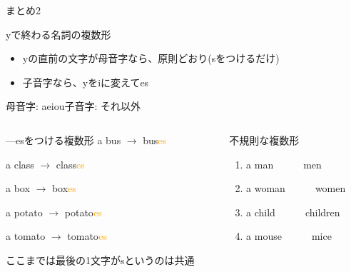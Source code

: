 \documentclass[aspectratio=169,xcolor={dvipsnames,table}]{beamer}
\begin{document}
\begin{frame}[plain]{まとめ2}
 \begin{block}{yで終わる名詞の複数形}
\begin{itemize}[square]
 \item yの直前の文字が母音字なら、原則どおり(sをつけるだけ)\hspace{15pt}\dbend
 \item \phantom{yの直前の文字が}子音字なら、yをiに変えてes 
\end{itemize}
\hfill{\scriptsize 母音字: aeiou\hspace{10pt}子音字: それ以外}
\end{block}

\pause

\begin{columns}
\begin{column}{.45\textwidth}
\begin{block}{---esをつける複数形}
a bus $\longrightarrow$ bus\textcolor{orange}{es}%
\hfill{}\hspace*{25pt}

a class $\longrightarrow$ class\textcolor{orange}{es}
\hfill{}\hspace*{25pt}

a box  $\longrightarrow$ box\textcolor{orange}{es}
\hfill{}\hspace*{25pt}

a potato $\longrightarrow$ potato\textcolor{orange}{es}
\hfill{}\hspace*{25pt}

a tomato $\longrightarrow$ tomato\textcolor{orange}{es}
\hfill{}\hspace*{25pt}
\end{block}
{\scriptsize ここまでは最後の1文字がsというのは共通}
\end{column}
\pause
\begin{column}{.45\textwidth}
\begin{block}{不規則な複数形}
 \begin{enumerate}
 \item a man~~~\rightarrow{}~~~men
 \item a woman~~~\rightarrow{}~~~women
 \item a child~~~\rightarrow{}~~~children
 \item a mouse~~~\rightarrow{}~~~mice
  \end{enumerate}
\end{block}
\end{column}
\end{columns}
\end{frame}
\end{document}
